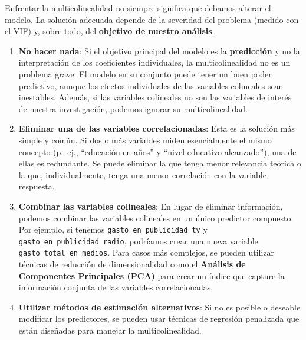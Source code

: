 \documentclass[
  letterpaper,
  DIV=11,
  numbers=noendperiod]{scrreprt}
\begin{document}
\begin{tcolorbox}[enhanced jigsaw, leftrule=.75mm, breakable, colbacktitle=quarto-callout-note-color!10!white, bottomrule=.15mm, colframe=quarto-callout-note-color-frame, toprule=.15mm, colback=white, coltitle=black, bottomtitle=1mm, left=2mm, title=\textcolor{quarto-callout-note-color}{\faInfo}\hspace{0.5em}{Soluciones a los problemas de multicolinealidad}, opacityback=0, arc=.35mm, opacitybacktitle=0.6, toptitle=1mm, titlerule=0mm, rightrule=.15mm]

Enfrentar la multicolinealidad no siempre significa que debamos alterar
el modelo. La solución adecuada depende de la severidad del problema
(medido con el VIF) y, sobre todo, del \textbf{objetivo de nuestro
análisis}.

\begin{enumerate}
\def\labelenumi{\arabic{enumi}.}
\item
  \textbf{No hacer nada}: Si el objetivo principal del modelo es la
  \textbf{predicción} y no la interpretación de los coeficientes
  individuales, la multicolinealidad no es un problema grave. El modelo
  en su conjunto puede tener un buen poder predictivo, aunque los
  efectos individuales de las variables colineales sean inestables.
  Además, si las variables colineales no son las variables de interés de
  nuestra investigación, podemos ignorar su multicolinealidad.
\item
  \textbf{Eliminar una de las variables correlacionadas}: Esta es la
  solución más simple y común. Si dos o más variables miden
  esencialmente el mismo concepto (p.~ej., ``educación en años'' y
  ``nivel educativo alcanzado''), una de ellas es redundante. Se puede
  eliminar la que tenga menor relevancia teórica o la que,
  individualmente, tenga una menor correlación con la variable
  respuesta.
\item
  \textbf{Combinar las variables colineales}: En lugar de eliminar
  información, podemos combinar las variables colineales en un único
  predictor compuesto. Por ejemplo, si tenemos
  \texttt{gasto\_en\_publicidad\_tv} y
  \texttt{gasto\_en\_publicidad\_radio}, podríamos crear una nueva
  variable \texttt{gasto\_total\_en\_medios}. Para casos más complejos,
  se pueden utilizar técnicas de reducción de dimensionalidad como el
  \textbf{Análisis de Componentes Principales (PCA)} para crear un
  índice que capture la información conjunta de las variables
  correlacionadas.
\item
  \textbf{Utilizar métodos de estimación alternativos}: Si no es posible
  o deseable modificar los predictores, se pueden usar técnicas de
  regresión penalizada que están diseñadas para manejar la
  multicolinealidad.


\end{enumerate}
\end{tcolorbox}
\end{document}
